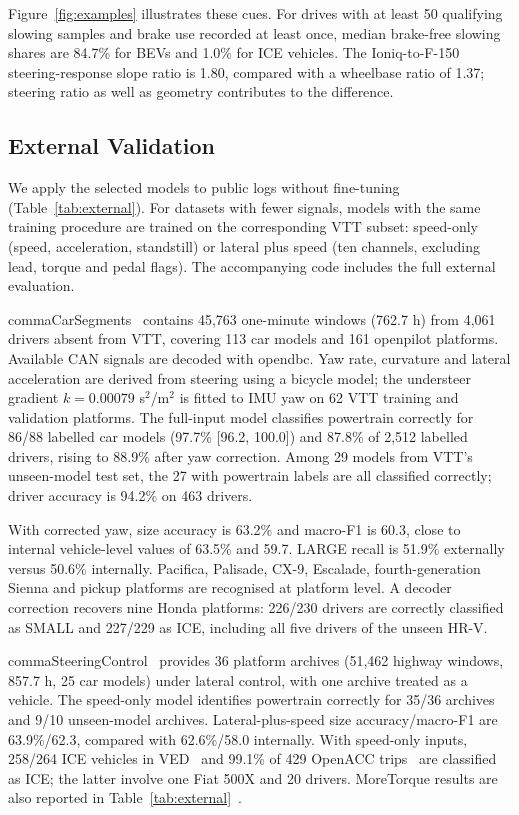 Figure~\ref{fig:examples} illustrates these cues. For drives with at least 50 qualifying slowing samples and brake use recorded at least once, median brake-free slowing shares are 84.7\% for BEVs and 1.0\% for ICE vehicles. The Ioniq-to-F-150 steering-response slope ratio is 1.80, compared with a wheelbase ratio of 1.37; steering ratio as well as geometry contributes to the difference.



\subsection{External Validation}
We apply the selected models to public logs without fine-tuning (Table~\ref{tab:external}). For datasets with fewer signals, models with the same training procedure are trained on the corresponding VTT subset: speed-only (speed, acceleration, standstill) or lateral plus speed (ten channels, excluding lead, torque and pedal flags). The accompanying code includes the full external evaluation.

commaCarSegments~\cite{commacarsegments} contains 45,763 one-minute windows (762.7 h) from 4,061 drivers absent from VTT, covering 113 car models and 161 openpilot platforms. Available CAN signals are decoded with opendbc. Yaw rate, curvature and lateral acceleration are derived from steering using a bicycle model; the understeer gradient $k=0.00079$ s$^2$/m$^2$ is fitted to IMU yaw on 62 VTT training and validation platforms. The full-input model classifies powertrain correctly for 86/88 labelled car models (97.7\% [96.2, 100.0]) and 87.8\% of 2,512 labelled drivers, rising to 88.9\% after yaw correction. Among 29 models from VTT's unseen-model test set, the 27 with powertrain labels are all classified correctly; driver accuracy is 94.2\% on 463 drivers.

With corrected yaw, size accuracy is 63.2\% and macro-F1 is 60.3, close to internal vehicle-level values of 63.5\% and 59.7. LARGE recall is 51.9\% externally versus 50.6\% internally. Pacifica, Palisade, CX-9, Escalade, fourth-generation Sienna and pickup platforms are recognised at platform level. A decoder correction recovers nine Honda platforms: 226/230 drivers are correctly classified as SMALL and 227/229 as ICE, including all five drivers of the unseen HR-V.

commaSteeringControl~\cite{commasteeringcontrol} provides 36 platform archives (51,462 highway windows, 857.7 h, 25 car models) under lateral control, with one archive treated as a vehicle. The speed-only model identifies powertrain correctly for 35/36 archives and 9/10 unseen-model archives. Lateral-plus-speed size accuracy/macro-F1 are 63.9\%/62.3, compared with 62.6\%/58.0 internally. With speed-only inputs, 258/264 ICE vehicles in VED~\cite{oh2019ved} and 99.1\% of 429 OpenACC trips~\cite{makridis2021openacc} are classified as ICE; the latter involve one Fiat 500X and 20 drivers. MoreTorque results are also reported in Table~\ref{tab:external}~\cite{moretorque}.


